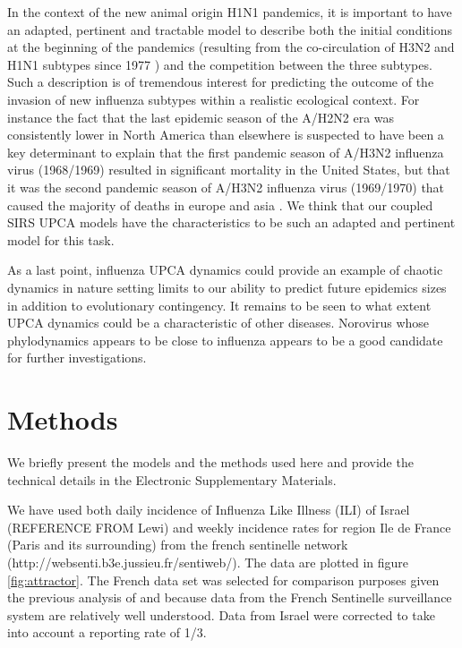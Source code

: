 \documentclass[12pt]{article}
\begin{document}
In the context of the new animal origin H1N1 pandemics, it is
important to have an adapted, pertinent and tractable model to
describe both the initial conditions at the beginning of the pandemics
(resulting from the co-circulation of H3N2 and H1N1 subtypes since
1977 \citep{Earn2002}) and the competition between the three subtypes.
Such a description is of tremendous interest for predicting the
outcome of the invasion of new influenza subtypes within a realistic
ecological context.  For instance the fact that the last epidemic
season of the A/H2N2 era was consistently lower in North America than
elsewhere is suspected to have been a key determinant to explain that
the first pandemic season of A/H3N2 influenza virus (1968/1969)
resulted in significant mortality in the United States, but that it
was the second pandemic season of A/H3N2 influenza virus (1969/1970)
that caused the majority of deaths in europe and asia
\citep{Viboud2005}.  We think that our coupled SIRS UPCA models have
the characteristics to be such an adapted and pertinent model for this
task.

As a last point, influenza UPCA dynamics could provide an example of
chaotic dynamics in nature setting limits to our ability to predict
future epidemics sizes in addition to evolutionary contingency. It
remains to be seen to what extent UPCA dynamics could be a
characteristic of other diseases. Norovirus whose phylodynamics
appears to be close to influenza \citep{Lopman2008} appears to be a
good candidate for further investigations.





\section*{Methods}


We briefly present the models and the methods used here and provide
the technical details in the Electronic Supplementary Materials.

We have used both daily incidence of Influenza Like Illness (ILI) of
Israel (REFERENCE FROM Lewi) and weekly incidence rates for region Ile
de France (Paris and its surrounding) from the french sentinelle
network (http://websenti.b3e.jussieu.fr/sentiweb/). The data are
plotted in figure \ref{fig:attractor}. The French data set was
selected for comparison purposes given the previous analysis of
\citet{Finkenstaedt2005} and because data from the French Sentinelle
surveillance system are relatively well understood.  Data from Israel
were corrected to take into account a reporting rate of 1/3.
\end{document}
